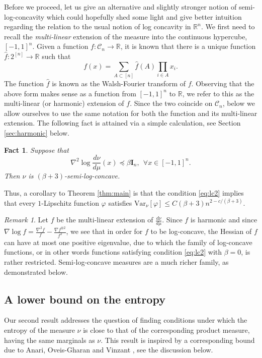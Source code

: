 \documentclass[12pt]{article}
\def \RR {\mathbb R}
\def \Var {\mathrm{Var}}
\def \DC {\mathcal{C}_n}
\def \Id {\mathbf{I}_n}
\newtheorem{fact}[theorem]{Fact}
\theoremstyle{definition}
\theoremstyle{remark}
\newtheorem{remark}[theorem]{Remark}
\begin{document}
Before we proceed, let us give an alternative and slightly stronger notion of semi-log-concavity which could hopefully shed some light and give better intuition regarding the relation to the usual notion of log concavity in $\RR^n$. We first need to recall the \emph{multi-linear} extension of the measure into the continuous hypercube, $[-1,1]^n$. Given a function $f:\DC \to \RR$, it is known that there is a unique function $\hat f:2^{[n]} \to \RR$ such that
\begin{equation}\label{eq:Fourier}
f(x) = \sum_{A \subset [n]} \hat f(A) \prod_{i \in A} x_i.
\end{equation}
The function $\hat f$ is known as the Walsh-Fourier transform of $f$. Observing that the above form makes sense as a function from $[-1,1]^n$ to $\RR$, we refer to this as the multi-linear (or harmonic) extension of $f$. Since the two coincide on $\DC$, below we allow ourselves to use the same notation for both the function and its multi-linear extension. The following fact is attained via a simple calculation, see Section \ref{sec:harmonic} below.
\begin{fact} \label{fact:harmonic}
Suppose that 
\begin{equation}\label{eq:lc2}
\nabla^2 \log \frac{d \nu}{d \mu}(x) \preceq \beta \Id, ~~ \forall x \in [-1,1]^n.
\end{equation}
Then $\nu$ is $(\beta+3)$-semi-log-concave.
\end{fact}
Thus, a corollary to Theorem \ref{thm:main} is that the condition \eqref{eq:lc2} implies that every $1$-Lipschitz function $\varphi$ satisfies $\Var_\nu[\varphi] \leq C(\beta+3)n^{2 - c/(\beta+3)}$.
\medskip
\begin{remark}
Let $f$ be the multi-linear extension of $\frac{d \nu}{d \mu}$. Since $f$ is harmonic and since $\nabla \log f = \frac{\nabla^2 f}{f} - \frac{\nabla f^{\otimes 2}}{f^2}$, we see that in order for $f$ to be log-concave, the Hessian of $f$ can have at most one positive eigenvalue, due to which the family of log-concave functions, or in other words functions satisfying condition \eqref{eq:lc2} with $\beta = 0$, is rather restricted. Semi-log-concave measures are a much richer family, as demonstrated below. 
\end{remark}

\subsection{A lower bound on the entropy}
Our second result addresses the question of finding conditions under which the entropy of the measure $\nu$ is close to that of the corresponding product measure, having the same marginals as $\nu$. This result is inspired by a corresponding bound due to Anari, Oveis-Gharan and Vinzant \cite[Theorem 5.2]{AOV1}, see the discussion below.
\end{document}
